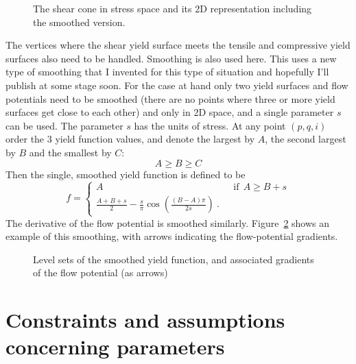 \documentclass[]{scrreprt}
\begin{document}
\begin{figure}[htb]
\begin{center}
\caption{The shear cone in stress space and its 2D representation
  including the smoothed version.}
\label{shear.cone.fig}
\end{center}
\end{figure}

The vertices where the shear yield surface meets the tensile and
compressive yield surfaces also need to be handled.  Smoothing is also
used here.  This uses a new type of smoothing that I invented for this
type of situation and hopefully I'll publish at some stage soon.  For
the case at hand only two yield surfaces and flow potentials need to
be smoothed (there are no points where three or more yield surfaces
get close to each other) and only in 2D space, and a single parameter
$s$ can be used.  The parameter $s$ has the units of stress.  At any
point $(p, q, i)$ order the 3 yield function values, and denote the
largest by $A$, the second largest by $B$ and the smallest by $C$:
\begin{equation}
A\geq B\geq C
\end{equation}
Then the single, smoothed yield function is defined to be
\begin{equation}
f = \left\{
\begin{array}{ll}
A & \ \ \ \mbox{if}\ \ A\geq B+s \\
\frac{A+B+s}{2} -
\frac{s}{\pi}\cos\left(\frac{(B-A)\pi}{2s}\right) \ .
\end{array}
\right.
\end{equation}
The derivative of the flow potential is smoothed similarly.
Figure~\ref{smoothed_entire.fig} shows an example of this smoothing,
with arrows indicating the flow-potential gradients.

\begin{figure}[htb]
\begin{center}
\caption{Level sets of the smoothed yield function, and associated
  gradients of the flow potential (as arrows)}
\label{smoothed_entire.fig}
\end{center}
\end{figure}





\chapter{Constraints and assumptions concerning parameters}
\label{assumptions.sec}
\end{document}
